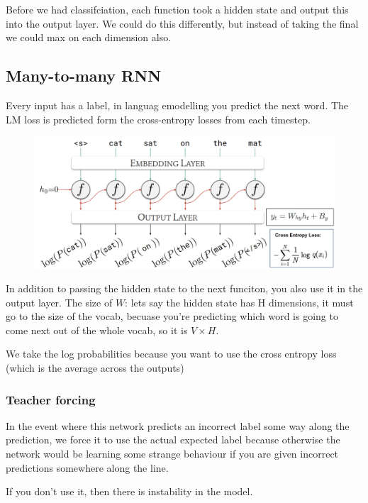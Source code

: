 \documentclass[11pt]{article}
\begin{document}
Before we had classifciation, each function took a hidden state and output this into the output layer. We could do this differently, but instead of taking the final we could max on each dimension also.

\subsection{Many-to-many RNN}

Every input has a label, in languag emodelling you predict the next word. The LM loss is predicted form the cross-entropy losses from each timestep.

\begin{figure}[H]
    \centering
    \includegraphics[width=\linewidth]{figures/rnn-mtm.png}
\end{figure}

In addition to passing the hidden state to the next funciton, you also use it in the output layer. The size of $W$: lets say the hidden state has H dimensions, it must go to the size of the vocab, becuase you're predicting which word is going to come next out of the whole vocab, so it is $V\times H$.

We take the log probabilities because you want to use the cross entropy loss (which is the average across the outputs)

\subsubsection{Teacher forcing}

In the event where this network predicts an incorrect label some way along the prediction, we force it to use the actual expected label because otherwise the network would be learning some strange behaviour if you are given incorrect predictions somewhere along the line.

If you don't use it, then there is instability in the model.
\end{document}
